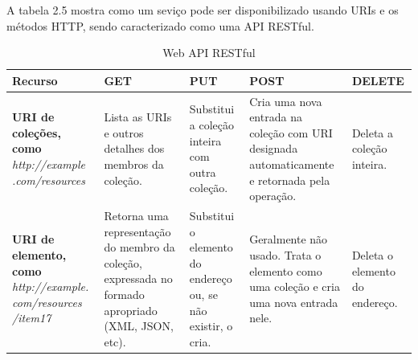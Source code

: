 A tabela 2.5 mostra como um seviço pode ser disponibilizado usando URIs e os métodos HTTP, sendo caracterizado como uma API RESTful.

\begin{table}[!h]
  \centering
	\begin{tabularx}{\textwidth}{|X|X|X|X|X|}
		\hline
			\textbf{Recurso} & \textbf{GET} & \textbf{PUT} & \textbf{POST} & \textbf{DELETE}
		\\
		\hline
			\textbf{URI de coleções, como} \textit{http://example .com/resources}
			& Lista as URIs e outros detalhes dos membros da coleção.
			& Substitui a coleção inteira com outra coleção.
		  & Cria uma nova entrada na coleção com URI designada automaticamente e retornada pela operação.
			& Deleta a coleção inteira.
		\\
		\hline
			\textbf{URI de elemento, como} \textit{http://example. com/resources /item17}
			& Retorna uma representação do membro da coleção, expressada no formado apropriado (XML, JSON, etc).
			& Substitui o elemento do endereço ou, se não existir, o cria.
		  & Geralmente não usado. Trata o elemento como uma coleção e cria uma nova entrada nele.
			& Deleta o elemento do endereço.
		\\
\hline
\end{tabularx}
\caption{Web API RESTful}
\end{table}
